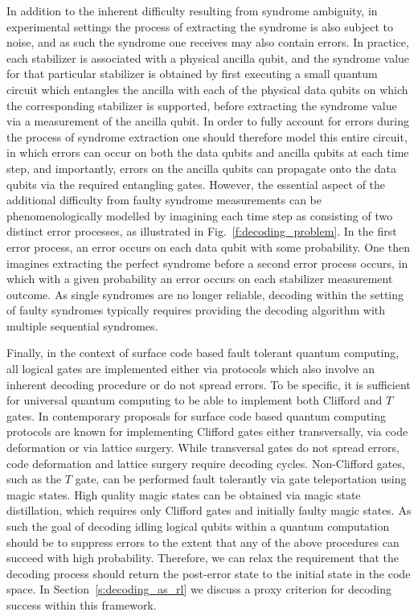 \documentclass[twocolumn,preprintnumbers,amsmath,amssymb,notitlepage,nofootinbib,longbibliography,superscriptaddress,aps,pra,10pt]{revtex4-1}
\begin{document}
	In addition to the inherent difficulty resulting from syndrome ambiguity, in experimental settings the process of extracting the syndrome is also subject to noise, and as such the syndrome one receives may also contain errors.
	In practice, each stabilizer is associated with a physical ancilla qubit, and the syndrome value for that particular stabilizer is obtained by first executing a small quantum circuit which entangles the ancilla with each of the physical data qubits on which the corresponding stabilizer is supported, before extracting the syndrome value via a measurement of the ancilla qubit.
	In order to fully account for errors during the process of syndrome extraction one should therefore model this entire circuit, in which errors can occur on both the data qubits and ancilla qubits at each time step, and importantly, errors on the ancilla qubits can propagate onto the data qubits via the required entangling gates.
	However, the essential aspect of the additional difficulty from faulty syndrome measurements can be phenomenologically modelled by imagining each time step as consisting of two distinct error processes, as illustrated in Fig.~\ref{f:decoding_problem}.
	In the first error process, an error occurs on each data qubit with some probability.
	One then imagines extracting the perfect syndrome before a second error process occurs, in which with a given probability an error occurs on each stabilizer measurement outcome.
	As single syndromes are no longer reliable, decoding within the setting of faulty syndromes typically requires providing the decoding algorithm with multiple sequential syndromes.

	Finally, in the context of surface code based fault tolerant quantum computing, all logical gates are implemented either via protocols which also involve an inherent decoding procedure or do not spread errors.
	To be specific, it is sufficient for universal quantum computing to be able to implement both Clifford and $T$ gates.
	In contemporary proposals for surface code based quantum computing protocols are known for implementing Clifford gates either transversally, via code deformation or via lattice surgery.
	While transversal gates do not spread errors, code deformation and lattice surgery require decoding cycles.
	Non-Clifford gates, such as the $T$ gate, can be performed fault tolerantly via gate teleportation using magic states.
	High quality magic states can be obtained via magic state distillation, which requires only Clifford gates and initially faulty magic states.
	As such the goal of decoding idling logical qubits within a quantum computation should be to suppress errors to the extent that any of the above procedures can succeed with high probability.
	Therefore, we can relax the requirement that the decoding process should return the post-error state to the initial state in the code space.
	In Section~\ref{s:decoding_as_rl} we discuss a proxy criterion for decoding success within this framework.
\end{document}
